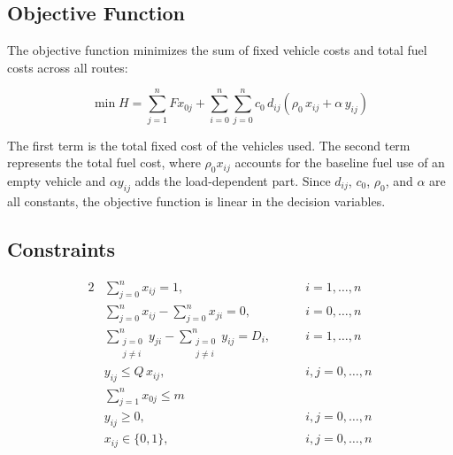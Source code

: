 \documentclass [a4paper, 11pt, titlepage] {article}
\begin{document}
\subsection{Objective Function}

The objective function minimizes the sum of fixed vehicle costs and total fuel costs across all routes:

\begin{equation}
    \min H = \sum_{j=1}^{n} F x_{0j} + \sum_{i=0}^{n} \sum_{j=0}^{n} c_0 \, d_{ij} \left( \rho_0 \, x_{ij} + \alpha \, y_{ij} \right) \label{eq:obj}
\end{equation}

The first term is the total fixed cost of the vehicles used. The second term represents the total fuel cost, where $\rho_0 x_{ij}$ accounts for the baseline fuel use of an empty vehicle and $\alpha y_{ij}$ adds the load-dependent part. Since $d_{ij}$, $c_0$, $\rho_0$, and $\alpha$ are all constants, the objective function is linear in the decision variables.

\subsection{Constraints}

\begin{alignat}{2}
    & \sum_{j=0}^{n} x_{ij} = 1, \qquad & i = 1, \ldots, n \label{eq:c1} \\[6pt]
    & \sum_{j=0}^{n} x_{ij} - \sum_{j=0}^{n} x_{ji} = 0, \qquad & i = 0, \ldots, n \label{eq:c2} \\[6pt]
    & \sum_{\substack{j=0 \\ j \neq i}}^{n} y_{ji} - \sum_{\substack{j=0 \\ j \neq i}}^{n} y_{ij} = D_i, \qquad & i = 1, \ldots, n \label{eq:c3} \\[6pt]
    & y_{ij} \leq Q \, x_{ij}, \qquad & i,j = 0, \ldots, n \label{eq:c4} \\[6pt]
    & \sum_{j=1}^{n} x_{0j} \leq m \label{eq:c5} \\[6pt]
    & y_{ij} \geq 0, \qquad & i,j = 0, \ldots, n \label{eq:c6} \\[6pt]
    & x_{ij} \in \{0,1\}, \qquad & i,j = 0, \ldots, n \label{eq:c7}
\end{alignat}
\end{document}
